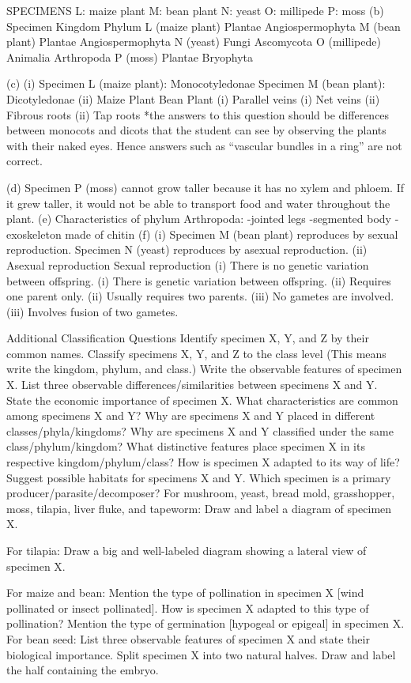 \begin{enumerate}
SPECIMENS
L: maize plant
M: bean plant
N: yeast
O: millipede
P: moss
(b) 
Specimen
Kingdom
Phylum
L (maize plant)
Plantae
Angiospermophyta
M (bean plant)
Plantae
Angiospermophyta
N (yeast)
Fungi
Ascomycota
O (millipede)
Animalia
Arthropoda
P (moss)
Plantae
Bryophyta

 (c) (i)	Specimen L (maize plant): Monocotyledonae
	Specimen M (bean plant): Dicotyledonae
      (ii) 
Maize Plant
Bean Plant
(i) Parallel veins
(i) Net veins
(ii) Fibrous roots
(ii) Tap roots
*the answers to this question should be differences between monocots and dicots that the student can see by observing the plants with their naked eyes. Hence answers such as “vascular bundles in a ring” are not correct.

(d) Specimen P (moss) cannot grow taller because it has no xylem and phloem. If it grew taller, it would not be able to transport food and water throughout the plant.
(e) Characteristics of phylum Arthropoda:
	-jointed legs
	-segmented body
	-exoskeleton made of chitin
(f) (i) Specimen M (bean plant) reproduces by sexual reproduction. Specimen N (yeast) reproduces by asexual reproduction.
     (ii) 
Asexual reproduction
Sexual reproduction
(i) There is no genetic variation 
  between offspring.
(i) There is genetic variation 
  between offspring.
(ii) Requires one parent only.
(ii) Usually requires two parents.
(iii) No gametes are involved.
(iii) Involves fusion of two gametes.

Additional Classification Questions
Identify specimen X, Y, and Z by their common names.
Classify specimens X, Y, and Z to the class level
	(This means write the kingdom, phylum, and class.)
Write the observable features of specimen X.
List three observable differences/similarities between specimens X and Y.
State the economic importance of specimen X.
What characteristics are common among specimens X and Y?
Why are specimens X and Y placed in different classes/phyla/kingdoms?
Why are specimens X and Y classified under the same class/phylum/kingdom?
What distinctive features place specimen X in its respective kingdom/phylum/class?
How is specimen X adapted to its way of life? 
Suggest possible habitats for specimens X and Y.
Which specimen is a primary producer/parasite/decomposer?
For mushroom, yeast, bread mold, grasshopper, moss, tilapia, liver fluke, and tapeworm:
Draw and label a diagram of specimen X.

For tilapia:
Draw a big and well-labeled diagram showing a lateral view of specimen X.

For maize and bean:
Mention the type of pollination in specimen X [wind pollinated or insect pollinated]. How is specimen X adapted to this type of pollination?
Mention the type of germination [hypogeal or epigeal] in specimen X.
For bean seed:
List three observable features of specimen X and state their biological importance.
Split specimen X into two natural halves. Draw and label the half containing the embryo.


\end{enumerate}
